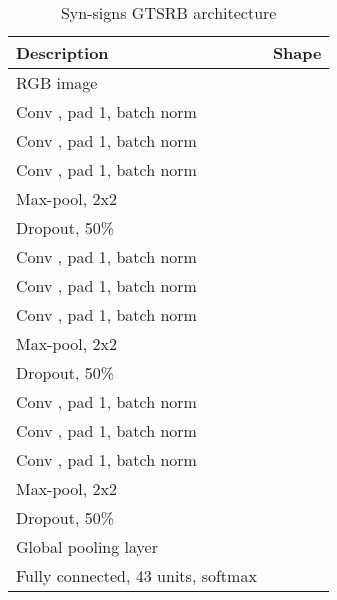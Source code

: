 \documentclass{article}
\begin{document}
\begin{table}[h!t]
\footnotesize
\begin{center}
\begin{tabular}{|ll|}
\hline
\multicolumn{1}{|l|}{Description} &
Shape \\
\hline
 RGB image                              &      \\

Conv , pad 1, batch norm        &     \\
Conv , pad 1, batch norm        &     \\
Conv , pad 1, batch norm        &     \\
Max-pool, 2x2                                         &     \\
Dropout, 50\%                                         &     \\

Conv , pad 1, batch norm       &    \\
Conv , pad 1, batch norm       &    \\
Conv , pad 1, batch norm       &    \\
Max-pool, 2x2                                         &    \\
Dropout, 50\%                                         &    \\

Conv , pad 1, batch norm       &    \\
Conv , pad 1, batch norm       &    \\
Conv , pad 1, batch norm       &    \\
Max-pool, 2x2                                         &      \\
Dropout, 50\%                                         &      \\

Global pooling layer                                  &      \\

Fully connected, 43 units, softmax                    &                         \\

\hline
\end{tabular}
\caption{Syn-signs  GTSRB architecture}
\label{tab:arch_synsigns_gtsrb}
\end{center}
\end{table}
\end{document}
